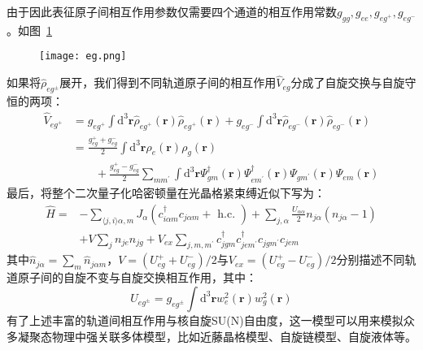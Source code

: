 由于因此表征原子间相互作用参数仅需要四个通道的相互作用常数$g_{gg},g_{ee},g_{eg^+},g_{eg^-}$。如图~\ref{eg}~
\begin{figure}[!htbp]
    \centering
    \texttt{[image: eg.png]}
    \label{eg}
\end{figure}
如果将$\hat{\rho}_{eg^\pm}$展开，我们得到不同轨道原子间的相互作用$\hat{V}_{eg}$分成了自旋交换与自旋守恒的两项：
\begin{equation}
\begin{aligned}
\hat{V}_{eg^+} &= g_{e g^+} \int \mathrm{d}^{3} \mathbf{r} \hat{\rho}_{eg^+}(\mathbf{r}) \hat{\rho}_{eg^+}(\mathbf{r})+g_{e g^-} \int \mathrm{d}^{3} \mathbf{r} \hat{\rho}_{eg^-}(\mathbf{r}) \hat{\rho}_{eg^-}(\mathbf{r})\\
\quad &= \frac{g_{e g}^{+}+g_{e g}^{-}}{2} \int \mathrm{d}^{3} \mathbf{r} \rho_{e}(\mathbf{r}) \rho_{g}(\mathbf{r}) \\ 
&\quad \quad + \frac{g_{e g}^{+}-g_{e g}^{-}}{2} \sum_{m m^{\prime}} \int \mathrm{d}^{3} \mathbf{r} \Psi_{g m}^{\dagger}(\mathbf{r}) \Psi_{e m^{\prime}}^{\dagger}(\mathbf{r}) \Psi_{g m^{\prime}}(\mathbf{r}) \Psi_{e m}(\mathbf{r})
\end{aligned}
\end{equation}
最后，将整个二次量子化哈密顿量在光晶格紧束缚近似下写为：
\begin{equation}
\begin{aligned}
\hat{H}=&-\sum_{\langle j, i\rangle \alpha, m} J_{\alpha}\left(c_{i \alpha m}^{\dagger} c_{j \alpha m}+\text { h.c. }\right)+\sum_{j, \alpha} \frac{U_{\alpha \alpha}}{2} n_{j \alpha}\left(n_{j \alpha}-1\right) \\
&+V \sum_{j} n_{j e} n_{j g}+V_{e x} \sum_{j, m, m^{\prime}} c_{j g m}^{\dagger} c_{j e m^{\prime}}^{\dagger} c_{j g m^{\prime}} c_{j e m}
\end{aligned}
\end{equation}
其中$\hat{n}_{j\alpha}=\sum_m \hat{n}_{j\alpha m}$，$V=\left(U_{e g}^{+}+U_{e g}^{-}\right) / 2$与$V_{ex}=\left(U_{e g}^{+}-U_{e g}^{-}\right) / 2$分别描述不同轨道原子间的自旋不变与自旋交换相互作用，其中：
\begin{equation}
U_{eg^\pm} = g_{eg^\pm} \int \mathrm{d}^{3} \mathbf{r} w_e^2(\mathbf{r})w_g^2(\mathbf{r})
\end{equation}
有了上述丰富的轨道间相互作用与核自旋SU(N)自由度，这一模型可以用来模拟众多凝聚态物理中强关联多体模型，比如近藤晶格模型、自旋链模型、自旋液体等。


